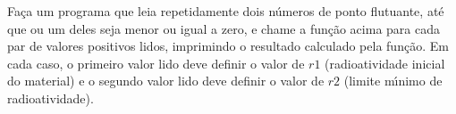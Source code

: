 \documentclass[brazil]{article}
\begin{document}
\begin{enumerate}
Fa\c{c}a um programa que leia repetidamente dois n\'umeros de ponto
flutuante, at\'e que ou um deles seja menor ou igual a zero, e chame a
fun\c{c}\~ao acima para cada par de valores positivos lidos,
imprimindo o resultado calculado pela fun\c{c}\~ao. Em cada caso, o
primeiro valor lido deve definir o valor de $r1$ (radioatividade
inicial do material) e o segundo valor lido deve definir o valor de
$r2$ (limite m\'{\i}nimo de radioatividade).

\end{enumerate}
\end{document}
